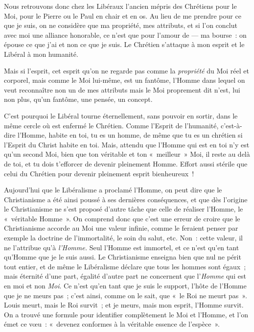 \documentclass[french,twoside]{book} %
\begin{document}
Nous retrouvons donc chez les Libéraux l’ancien mépris des Chrétiens pour le Moi, pour le Pierre ou  le Paul en chair et en os. Au lieu de me prendre pour ce que je suis, on ne considère que ma propriété, mes attributs, et si l’on conclut avec moi une alliance honorable, ce n’est que pour l’amour de — ma bourse : on épouse ce que j’ai et non ce que je suis. Le Chrétien s’attaque à mon esprit et le Libéral à mon humanité.\par
Mais si l’esprit, cet esprit qu’on ne regarde pas comme la \emph{propriété} du Moi réel et corporel, mais comme le Moi lui-même, est un fantôme, l’Homme dans lequel on veut reconnaître non un de mes attributs mais le Moi proprement dit n’est, lui non plus, qu’un fantôme, une pensée, un concept.\par
C’est pourquoi le Libéral tourne éternellement, sans pouvoir en sortir, dans le même cercle où est enfermé le Chrétien. Comme l’Esprit de l’humanité, c’est-à-dire l’Homme, habite en toi, tu es un homme, de même que tu es un chrétien si l’Esprit du Christ habite en toi. Mais, attendu que l’Homme qui est en toi n’y est qu’un second Moi, bien que ton véritable et ton « meilleur » Moi, il reste au delà de toi, et tu dois t’efforcer de devenir pleinement Homme. Effort aussi stérile que celui du Chrétien pour devenir pleinement esprit bienheureux !\par
Aujourd’hui que le Libéralisme a proclamé l’Homme, on peut dire que le Christianisme a été ainsi poussé à ses dernières conséquences, et que dès l’origine le Christianisme ne s’est proposé d’autre tâche que celle de réaliser l’Homme, le « véritable Homme ». On comprend donc que c’est une erreur de croire que le Christianisme accorde au Moi une valeur infinie, comme le feraient penser par exemple la doctrine de l’immortalité, le soin du salut, etc. Non : cette valeur, il ne l’attribue qu’à \emph{l’Homme.} Seul l’Homme est immortel, et ce n’est qu’en tant qu’Homme que je le suis aussi. Le Christianisme enseigna bien que nul ne périt tout entier, et de même le Libéralisme déclare que tous les hommes sont  égaux ; mais éternité d’une part, égalité d’autre part ne concernent que l’\emph{Homme} qui est en moi et non \emph{Moi}. Ce n’est qu’en tant que je suis le support, l’hôte de l’Homme que je ne meurs pas ; c’est ainsi, comme on le sait, que « le Roi ne meurt pas ». Louis meurt, mais le Roi survit ; et je meurs, mais mon esprit, l’Homme survit. On a trouvé une formule pour identifier complètement le Moi et l’Homme, et l’on émet ce vœu : « devenez conformes à la véritable essence de l’espèce ».\par
\end{document}
